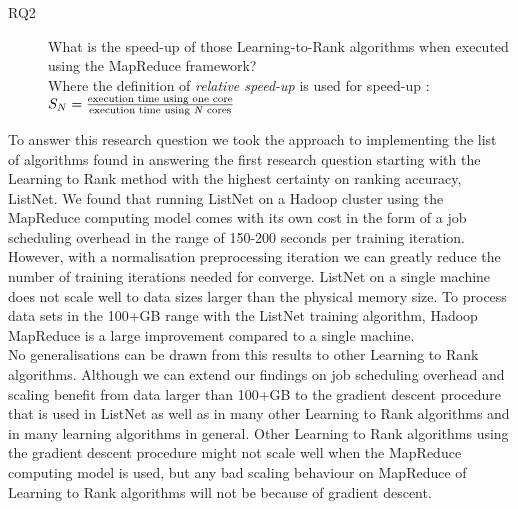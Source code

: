 \begin{description}
\item[RQ2] What is the speed-up of those Learning-to-Rank algorithms when executed using the MapReduce framework?\\
Where the definition of \emph{relative speed-up} is used for speed-up \cite{Sun1991}:\\

$S_N = \frac{\text{execution time using one core}}{\text{execution time using \emph{N} cores}}$
\end{description}
To answer this research question we took the approach to implementing the list of algorithms found in answering the first research question starting with the Learning to Rank method with the highest certainty on ranking accuracy, ListNet. We found that running ListNet on a Hadoop cluster using the MapReduce computing model comes with its own cost in the form of a job scheduling overhead in the range of 150-200 seconds per training iteration. However, with a normalisation preprocessing iteration we can greatly reduce the number of training iterations needed for converge. ListNet on a single machine does not scale well to data sizes larger than the physical memory size. To process data sets in the 100+GB range with the ListNet training algorithm, Hadoop MapReduce is a large improvement compared to a single machine.\\
No generalisations can be drawn from this results to other Learning to Rank algorithms. Although we can extend our findings on job scheduling overhead and scaling benefit from data larger than 100+GB to the gradient descent procedure that is used in ListNet as well as in many other Learning to Rank algorithms and in many learning algorithms in general. Other Learning to Rank algorithms using the gradient descent procedure might not scale well when the MapReduce computing model is used, but any bad scaling behaviour on MapReduce of Learning to Rank algorithms will not be because of gradient descent.

